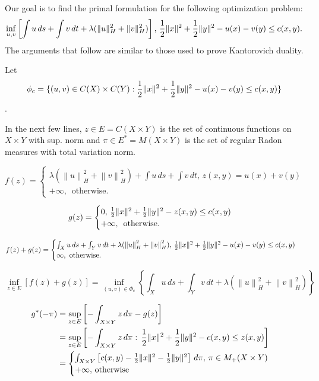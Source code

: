 Our goal is to find the primal formulation for the following optimization problem: 
$$ \inf_{u,v} \left[ \int u \, ds + \int v \, dt + \lambda (\lVert u\rVert_H^2 + \lVert v\rVert_H^2)\right],\, \frac{1}{2}\lVert x\rVert^2 + \frac{1}{2}\lVert y\rVert^2 - u(x) - v(y)\leq c(x,y). $$ The arguments that follow are similar to those used to prove Kantorovich duality.

Let $$\phi_c = \{ (u,v) \in C(X)\times C(Y): \frac{1}{2}\lVert x\rVert^2 + \frac{1}{2}\lVert y\rVert^2 - u(x) - v(y)\leq c(x,y)\}$$.

In the next few lines, $z \in E = C(X\times Y)$ is the set of continuous functions on $X\times Y$ with sup. norm and $\pi\in E^{*} = M(X\times Y)$ is the set of regular Radon measures with total variation norm.

$$f(z) = \begin{cases}
\lambda( \left\|u\right\|_H^2 + \left\|v\right\|_H^2) + \int u\,ds + \int v\,dt, \, z(x,y)=u(x)+v(y) \\
+\infty, \, \textrm{ otherwise.}
\end{cases}$$

$$g(z) = \begin{cases}
0, \, \frac{1}{2}\lVert x\rVert^2 + \frac{1}{2}\lVert y\rVert^2 - z(x,y)\leq c(x,y) \\
+\infty, \, \textrm{ otherwise.}
\end{cases}$$

$$f(z)+g(z) = \begin{cases}
\int_X u\,ds + \int_Y v\,dt + \lambda(\left\|u\right\|_H^2 + \left\|v\right\|_H^2), \, \frac{1}{2}\lVert x\rVert^2 + \frac{1}{2}\lVert y\rVert^2 - u(x) - v(y)\leq c(x,y) \\
\infty, \textrm{ otherwise.}
\end{cases}$$

$$\inf_{z\in E} [f(z)+g(z)] = \inf_{(u,v)\in \Phi_c} \left\{ \int_X u\,ds + \int_Y v\,dt + \lambda(\left\|u\right\|_H^2 + \left\|v\right\|_H^2) \right\}$$

\begin{align*}
g^{*}(-\pi) &= \sup_{z\in E} \left[ -\int_{X\times Y} z\,d\pi - g(z)\right] \\
&= \sup_{z\in E} \left[ - \int_{X\times Y} z\,d\pi :\, \frac{1}{2}\lVert x\rVert^2 + \frac{1}{2}\lVert y\rVert^2 - c(x,y)\leq z(x,y) \right] \\
&= \begin{cases}
\int_{X\times Y} \left[c(x,y) - \frac{1}{2}\lVert x\rVert^2 - \frac{1}{2}\lVert y\rVert^2\right] \,d\pi,\, \pi\in M_{+}(X\times Y) \\
+\infty, \, \textrm{otherwise}
\end{cases}
\end{align*}

